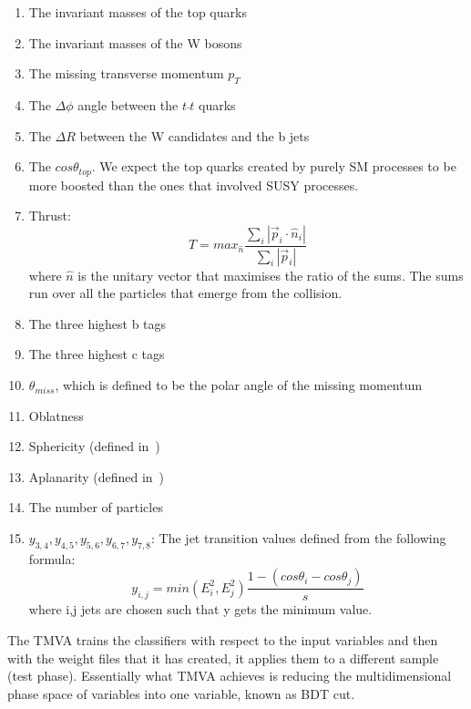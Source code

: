 \documentclass[12pt,a4paper]{report}
\begin{document}
\begin{enumerate}
 \item The invariant masses of the top quarks
 \item The invariant masses of the W bosons
 \item The missing transverse momentum  $p_{T}$
 \item The $\Delta \phi$ angle between the $t\bar{}t$ quarks
 \item The $\Delta R$  between the W candidates and the b jets
 \item The $cos\theta_{top}$. We expect the top quarks created by purely SM processes to be more boosted 
 than the ones that involved SUSY processes.
 \item Thrust: 
 \begin{equation}
  T=max_{\hat{n}}\frac{\sum_{i}^{}|\vec{p}_{i}\cdot \hat{n}_{i}|}{\sum_{i}^{}|\vec{p}_{i}|}
 \end{equation}
	where $\hat{n}$ is the unitary vector that maximises the ratio of the sums. The sums run over all the
	particles that emerge from the collision.

	
  \item The three highest b tags
  \item The three highest c tags
  \item $\theta_{miss}$, which is defined to be the polar angle of the missing momentum
  \item Oblatness
  \item Sphericity (defined in~\cite{chen2012new})
  \item Aplanarity (defined in~\cite{chen2012new})
  \item The number of particles
  \item $y_{3,4},y_{4,5},y_{5,6},y_{6,7},y_{7,8}$: The jet transition values defined from the following 
  formula:
  \begin{equation}
   y_{i,j}=min(E_{i}^{2},E_{j}^{2})\frac{1-(cos\theta_{i}-cos\theta_{j})}{s}
  \end{equation}
  where i,j jets are chosen such that y gets the minimum value. 
\end{enumerate}  

\newpage

The TMVA trains the classifiers with respect to the input variables and then with the weight files that it has
created, it applies them to a different sample (test phase). Essentially what TMVA achieves is reducing the 
multidimensional phase space of variables into one variable, known as BDT cut.
\end{document}
